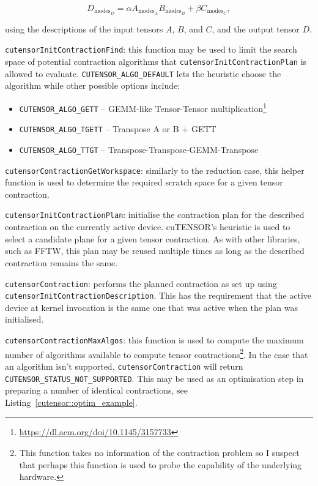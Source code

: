 \begin{equation*}
D_{\mathrm{modes}_D} = \alpha A_{\mathrm{modes}_A} B_{\mathrm{modes}_B} + \beta C_{\mathrm{modes}_C},
\end{equation*}

\noindent using the descriptions of the input tensors $A$, $B$, and $C$, and the output tensor $D$.

\vspace{0.5em}\texttt{cutensorInitContractionFind}: this function may be used to limit the search space of potential contraction algorithms that \texttt{cutensorInitContr\-actionPlan} is allowed to evaluate. \texttt{CUTENSOR\_ALGO\_DEFAULT} lets the heuristic choose the algorithm while other possible options include:

\begin{itemize}
\item \texttt{CUTENSOR\_ALGO\-\_GETT} -- GEMM-like Tensor-Tensor multiplication\footnote{\url{https://dl.acm.org/doi/10.1145/3157733}}
\item \texttt{CUTENSOR\_ALGO\_TGETT} -- Transpose A or B + GETT
\item \texttt{CUTENSOR\_ALGO\_TTGT} -- Transpose-Transpose-GEMM-Transpose
\end{itemize}


\vspace{0.5em}\texttt{cutensorContractionGetWorkspace}: similarly to the reduction case, this helper function is used to determine the required scratch space for a given tensor contraction.

\vspace{0.5em}\texttt{cutensorInitContractionPlan}: initialise the contraction plan for the described contraction on the currently active device. cuTENSOR’s heuristic is used to select a candidate plane for a given tensor contraction. As with other libraries, such as FFTW, this plan may be reused multiple times as long as the described contraction remains the same.


\vspace{0.5em}\texttt{cutensorContraction}: performs the planned contraction as set up using \texttt{cutensorInitContractionDescription}. This has the requirement that the active device at kernel invocation is the same one that was active when the plan was initialised.


\vspace{0.5em}\texttt{cutensorContractionMaxAlgos}: this function is used to compute the maximum number of algorithms available to compute tensor contractions\footnote{This function takes no information of the contraction problem so I suspect that perhaps this function is used to probe the capability of the underlying hardware.}. In the case that an algorithm isn't supported, \texttt{cutensorContraction} will return \texttt{CUTENSOR\_STAT\-US\_NOT\_SUPPORTED}. This may be used as an optimisation step in preparing a number of identical contractions, see Listing~\ref{cutensor::optim_example}.

